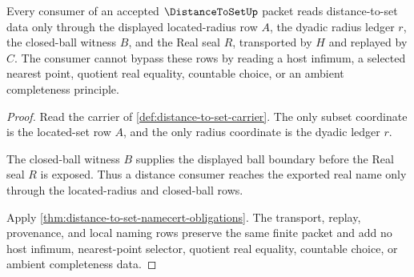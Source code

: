 \begin{theorem}
\label{thm:distance-to-set-located-radius-handoff}
Every consumer of an accepted $\DistanceToSetUp$ packet reads distance-to-set data only through the displayed located-radius row $A$, the dyadic radius ledger $r$, the closed-ball witness $B$, and the Real seal $R$, transported by $H$ and replayed by $C$. The consumer cannot bypass these rows by reading a host infimum, a selected nearest point, quotient real equality, countable choice, or an ambient completeness principle.
\end{theorem}
\begin{proof}
Read the carrier of \autoref{def:distance-to-set-carrier}. The only subset coordinate is the located-set row $A$, and the only radius coordinate is the dyadic ledger $r$.

The closed-ball witness $B$ supplies the displayed ball boundary before the Real seal $R$ is exposed. Thus a distance consumer reaches the exported real name only through the located-radius and closed-ball rows.

Apply \autoref{thm:distance-to-set-namecert-obligations}. The transport, replay, provenance, and local naming rows preserve the same finite packet and add no host infimum, nearest-point selector, quotient real equality, countable choice, or ambient completeness data.
\end{proof}


\begin{closurestatus}{\DistanceToSetUp}
  \theoryclosure{\seedClosure}
  \formalstatus{\unformalizedV}
\end{closurestatus}
